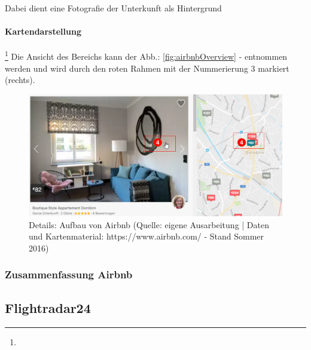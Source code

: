 \documentclass[../Bachelorarbeit.tex]{subfiles}
\begin{document}
Dabei dient eine Fotografie der Unterkunft als Hintergrund 


\paragraph{Kartendarstellung}\footnote{}
\label{airbnb:map}
Die Ansicht des Bereichs kann der Abb.: \ref{fig:airbnbOverview} -  entnommen werden und wird durch den roten Rahmen mit der Nummerierung 3 markiert (rechts).


\begin{figure}[H]
\centering
\includegraphics[width=1\linewidth]{img/StandDerTechnik/airbnbDetail}
\caption[Details: Aufbau von Airbnb]{Details: Aufbau von Airbnb (Quelle: eigene Ausarbeitung | Daten und Kartenmaterial: https://www.airbnb.com/ - Stand Sommer 2016)}
\label{fig:airbnbDetail}
\end{figure}

\subsubsection{Zusammenfassung Airbnb}
\label{airbnb:review}


\subsection{Flightradar24}
\end{document}
